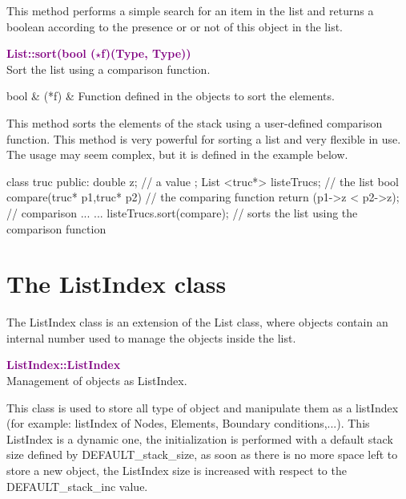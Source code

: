 This method performs a simple search for an item in the list and returns a boolean according to the presence or or not of this object in the list.

\textcolor{purple}{\textbf{List::sort(bool ($\star$f)(Type, Type))}}\label{List::sort(bool (*f)(Type, Type))}\\
Sort the list using a comparison function.

\begin{tcolorbox}[width=\textwidth,myArgs,tabularx={ll|R}]
bool & (*f) & Function defined in the objects to sort the elements.
\end{tcolorbox}

This method sorts the elements of the stack using a user-defined comparison function.
This method is very powerful for sorting a list and very flexible in use.
The usage may seem complex, but it is defined in the example below.
\begin{CppListing}
class truc
{
  public:
  double z; // a value
};
List <truc*> listeTrucs; // the list
bool compare(truc* p1,truc* p2) // the comparing function
{
  return (p1->z < p2->z); // comparison
}
...
{
...
listeTrucs.sort(compare); // sorts the list using the comparison function
}
\end{CppListing}

\section{The ListIndex class}

The ListIndex class is an extension of the List class, where objects contain an internal number used to manage the objects inside the list.

\textcolor{purple}{\textbf{ListIndex::ListIndex}}\label{ListIndex::ListIndex}\\
Management of objects as ListIndex.

This class is used to store all type of object and manipulate them as a listIndex (for example: listIndex of Nodes, Elements, Boundary conditions,...).
This ListIndex is a dynamic one, the initialization is performed with a default stack size defined by DEFAULT\_stack\_size, as soon as there is no more space left to store a new object,
the ListIndex size is increased with respect to the DEFAULT\_stack\_inc value.




